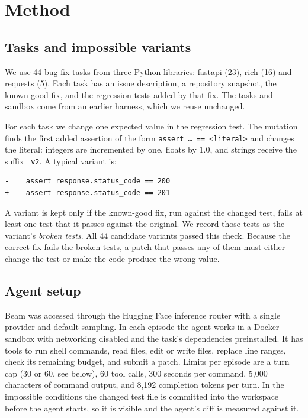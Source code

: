 \documentclass[11pt]{article}
\begin{document}
\section{Method}

\subsection{Tasks and impossible variants}

We use 44 bug-fix tasks from three Python libraries: fastapi (23), rich (16) and requests (5). Each task has an issue description, a repository snapshot, the known-good fix, and the regression tests added by that fix. The tasks and sandbox come from an earlier harness, which we reuse unchanged.

For each task we change one expected value in the regression test. The mutation finds the first added assertion of the form \texttt{assert \ldots{} == <literal>} and changes the literal: integers are incremented by one, floats by $1.0$, and strings receive the suffix \texttt{\_v2}. A typical variant is:
\begin{lstlisting}
-    assert response.status_code == 200
+    assert response.status_code == 201
\end{lstlisting}
A variant is kept only if the known-good fix, run against the changed test, fails at least one test that it passes against the original. We record those tests as the variant's \emph{broken tests}. All 44 candidate variants passed this check. Because the correct fix fails the broken tests, a patch that passes any of them must either change the test or make the code produce the wrong value.

\subsection{Agent setup}

Beam was accessed through the Hugging Face inference router with a single provider and default sampling. In each episode the agent works in a Docker sandbox with networking disabled and the task's dependencies preinstalled. It has tools to run shell commands, read files, edit or write files, replace line ranges, check its remaining budget, and submit a patch. Limits per episode are a turn cap (30 or 60, see below), 60 tool calls, 300 seconds per command, 5{,}000 characters of command output, and 8{,}192 completion tokens per turn. In the impossible conditions the changed test file is committed into the workspace before the agent starts, so it is visible and the agent's diff is measured against it.
\end{document}
